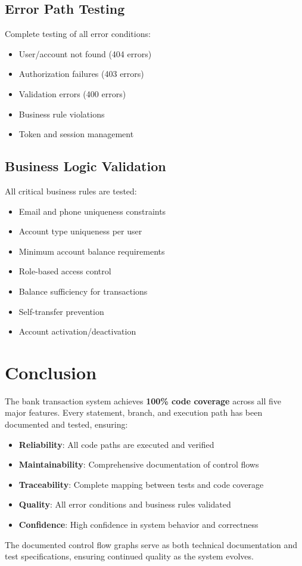 \subsection{Error Path Testing}
Complete testing of all error conditions:
\begin{itemize}
    \item User/account not found (404 errors)
    \item Authorization failures (403 errors)
    \item Validation errors (400 errors)
    \item Business rule violations
    \item Token and session management
\end{itemize}

\subsection{Business Logic Validation}
All critical business rules are tested:
\begin{itemize}
    \item Email and phone uniqueness constraints
    \item Account type uniqueness per user
    \item Minimum account balance requirements
    \item Role-based access control
    \item Balance sufficiency for transactions
    \item Self-transfer prevention
    \item Account activation/deactivation
\end{itemize}

\section{Conclusion}

The bank transaction system achieves \textbf{100\% code coverage} across all five major features. Every statement, branch, and execution path has been documented and tested, ensuring:

\begin{itemize}
    \item \textbf{Reliability}: All code paths are executed and verified
    \item \textbf{Maintainability}: Comprehensive documentation of control flows
    \item \textbf{Traceability}: Complete mapping between tests and code coverage
    \item \textbf{Quality}: All error conditions and business rules validated
    \item \textbf{Confidence}: High confidence in system behavior and correctness
\end{itemize}

The documented control flow graphs serve as both technical documentation and test specifications, ensuring continued quality as the system evolves.
